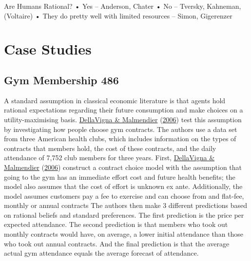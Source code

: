 \documentclass[11pt,preprint, authoryear]{elsarticle}
\numberwithin{equation}{section}
\numberwithin{figure}{section}
\numberwithin{table}{section}
\begin{document}
Are Humans Rational? • Yes -- Anderson, Chater • No -- Tversky,
Kahneman, (Voltaire) • They do pretty well with limited resources --
Simon, Gigerenzer

\hypertarget{case-studies}{%
\section{\texorpdfstring{Case Studies
\label{case}}{Case Studies }}\label{case-studies}}

\hypertarget{gym-membership-486}{%
\subsection{Gym Membership 486}\label{gym-membership-486}}

A standard assumption in classical economic literature is that agents
hold rational expectations regarding their future consumption and make
choices on a utility-maximising basis.
\protect\hyperlink{ref-gym}{DellaVigna \& Malmendier}
(\protect\hyperlink{ref-gym}{2006}) test this assumption by
investigating how people choose gym contracts. The authors use a data
set from three American health clubs, which includes information on the
types of contracts that members hold, the cost of these contracts, and
the daily attendance of 7,752 club members for three years. First,
\protect\hyperlink{ref-gym}{DellaVigna \& Malmendier}
(\protect\hyperlink{ref-gym}{2006}) construct a contract choice model
with the assumption that going to the gym has an immediate effort cost
and future health benefits; the model also assumes that the cost of
effort is unknown ex ante. Additionally, the model assumes customers pay
a fee to exercise and can choose from and flat-fee, monthly or annual
contracts The authors then make 3 different predictions based on
rational beliefs and standard preferences. The first prediction is the
price per expected attendance. The second prediction is that members who
took out monthly contracts would have, on average, a lower initial
attendance than those who took out annual contracts. And the final
prediction is that the average actual gym attendance equals the average
forecast of attendance.
\end{document}
